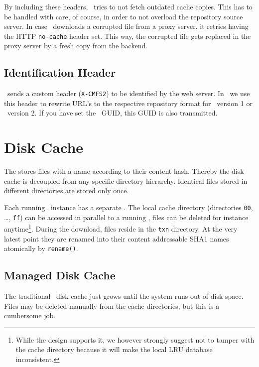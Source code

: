 By including these headers, \cvmfs\ tries to not fetch outdated cache copies.
This has to be handled with care, of course, in order to not overload the repository source server.
In case \cvmfs\ downloads a corrupted file from a proxy server, it retries having the HTTP \texttt{no-cache} header set.
This way, the corrupted file gets replaced in the proxy server by a fresh copy from the backend.

\subsection{Identification Header}
\cvmfs\ sends a custom header (\lstinline{X-CMFS2}) to be identified by the web server.
In \cernvm\ we use this header to rewrite URL's to the respective repository format for \cvmfs\ version 1 or \cvmfs\ version 2.
If you have set the \cernvm\ GUID, this GUID is also transmitted.

\section{Disk Cache}

The  stores files with a name according to their  content hash.
Thereby the disk cache is decoupled from any specific directory hierarchy.
Identical files stored in different directories are stored only once.

Each running \cvmfs\ instance has a separate . 
The local cache directory (directories \texttt{00}, \dots, \texttt{ff}) can be accessed in parallel to a running \cvmfs, \ie files can be deleted for instance anytime\footnote{While the design supports it, we however strongly suggest not to tamper with the cache directory because it will make the local LRU database inconsistent.}. 
During the download, files reside in the \texttt{txn} directory. 
At the very latest point they are renamed into their content addressable SHA1 names atomically by \texttt{rename()}. 

\subsection{Managed Disk Cache}
\label{sct:mamangedcache}
The traditional \cvmfs\ disk cache just grows until the system runs out of disk space.
Files may be deleted manually from the cache directories, but this is a cumbersome job.

